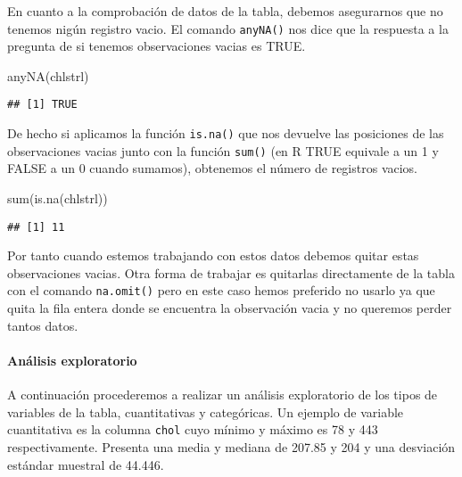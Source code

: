 \documentclass[
]{article}
\newenvironment{Shaded}{\begin{snugshade}}{\end{snugshade}}
\newcommand{\AttributeTok}[1]{\textcolor[rgb]{0.77,0.63,0.00}{#1}}
\newcommand{\ConstantTok}[1]{\textcolor[rgb]{0.00,0.00,0.00}{#1}}
\newcommand{\FunctionTok}[1]{\textcolor[rgb]{0.00,0.00,0.00}{#1}}
\newcommand{\NormalTok}[1]{#1}
\newcommand{\SpecialCharTok}[1]{\textcolor[rgb]{0.00,0.00,0.00}{#1}}
\begin{document}
En cuanto a la comprobación de datos de la tabla, debemos asegurarnos
que no tenemos nigún registro vacio. El comando \texttt{anyNA()} nos
dice que la respuesta a la pregunta de si tenemos observaciones vacias
es TRUE.

\begin{Shaded}
\begin{Highlighting}[]
\FunctionTok{anyNA}\NormalTok{(chlstrl)}
\end{Highlighting}
\end{Shaded}

\begin{verbatim}
## [1] TRUE
\end{verbatim}

De hecho si aplicamos la función \texttt{is.na()} que nos devuelve las
posiciones de las observaciones vacias junto con la función
\texttt{sum()} (en R TRUE equivale a un 1 y FALSE a un 0 cuando
sumamos), obtenemos el número de registros vacios.

\begin{Shaded}
\begin{Highlighting}[]
\FunctionTok{sum}\NormalTok{(}\FunctionTok{is.na}\NormalTok{(chlstrl))}
\end{Highlighting}
\end{Shaded}

\begin{verbatim}
## [1] 11
\end{verbatim}

Por tanto cuando estemos trabajando con estos datos debemos quitar estas
observaciones vacias. Otra forma de trabajar es quitarlas directamente
de la tabla con el comando \texttt{na.omit()} pero en este caso hemos
preferido no usarlo ya que quita la fila entera donde se encuentra la
observación vacia y no queremos perder tantos datos.

\hypertarget{anuxe1lisis-exploratorio}{%
\paragraph{Análisis exploratorio}\label{anuxe1lisis-exploratorio}}

A continuación procederemos a realizar un análisis exploratorio de los
tipos de variables de la tabla, cuantitativas y categóricas. Un ejemplo
de variable cuantitativa es la columna \texttt{chol} cuyo mínimo y
máximo es 78 y 443 respectivamente. Presenta una media y mediana de
207.85 y 204 y una desviación estándar muestral de 44.446.

\begin{Shaded}
\end{Shaded}
\end{document}
